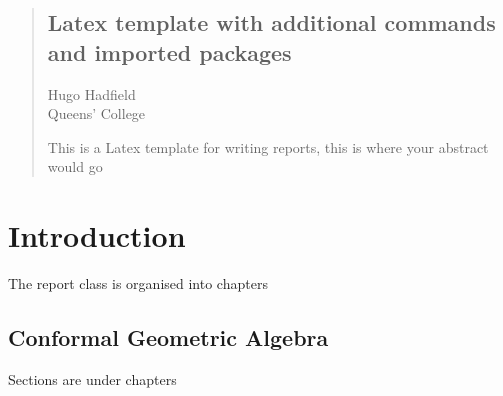 \documentclass[12pt,a4paper,twoside=semi]{report}
\begin{document}
\tableofcontents

\begin{abstract}
\begin{center}
\section*{Latex template with additional commands and imported packages}
Hugo Hadfield\\
Queens' College
\end{center}

This is a Latex template for writing reports, this is where your abstract would go
\end{abstract}

\chapter{Introduction}
The report class is organised into chapters

\section{Conformal Geometric Algebra}
Sections are under chapters
\end{document}
